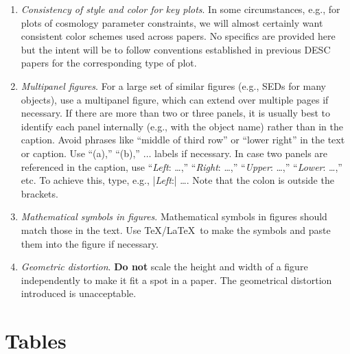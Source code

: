 \documentclass[letterpaper,11pt]{article}
\begin{document}
\begin{enumerate}
\item{{\it Consistency of style and color for key plots\/}.  In some circumstances, e.g., for plots of cosmology parameter constraints, we will almost certainly want consistent color schemes used across papers.  No specifics are provided here but the intent will be to follow conventions established in previous DESC papers for the corresponding type of plot. }

\item {\it Multipanel figures\/}.  For a large set of similar figures (e.g.,
SEDs for many objects), use a multipanel figure, which can extend over multiple
pages if necessary.  If there are more than two or three panels, it is usually
best to identify each panel internally (e.g., with the object name) rather
than in the caption.  Avoid phrases like ``middle of third row'' or ``lower
right'' in the text or caption.  Use ``(a),''  ``(b),'' $\dots$ labels if
necessary.  In case two panels are referenced in the caption, use
``{\it Left\/}: \dots,'' ``{\it Right\/}: \dots ,'' ``{\it Upper\/}: \dots,''
``{\it Lower\/}: \dots,''
etc.  To achieve this, type, e.g., |\emph{Left}:| \dots.
Note that the colon is outside the brackets.

\item {\it Mathematical symbols in figures\/}.  Mathematical symbols in
figures should match those in the text. Use \TeX/La\TeX\ to make the symbols
and paste them into the figure if necessary.

\item {\it Geometric distortion\/}.  {\bf Do not} scale the height and width of a figure independently to make it fit a spot in a paper.  The geometrical distortion introduced is unacceptable.  
\end{enumerate}

\section{Tables} \label{sec:tables}

\end{document}
